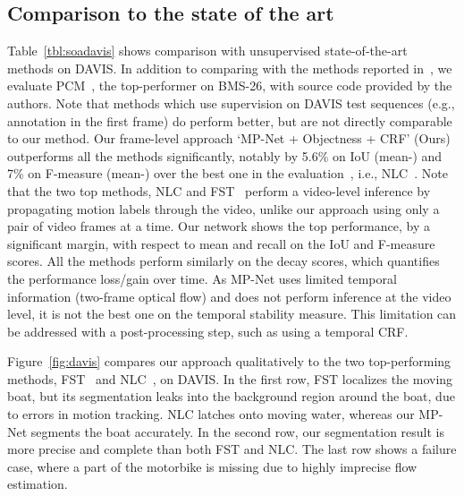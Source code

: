 \documentclass[10pt,twocolumn,letterpaper]{article}
\begin{document}
\subsection{Comparison to the state of the art}
\label{sec:soa}
\vspace{-0.2cm}
Table~\ref{tbl:soadavis} shows comparison with unsupervised state-of-the-art
methods on DAVIS. In addition to comparing with the methods reported
in~\cite{Perazzi16}, we evaluate PCM~\cite{Bideau16}, the top-performer on
BMS-26, with source code provided by the authors. Note that methods which use
supervision on DAVIS test sequences (e.g., annotation in the first frame) do
perform better, but are not directly comparable to our method. Our frame-level
approach `MP-Net + Objectness + CRF' (Ours) outperforms all the methods
significantly, notably by 5.6\% on IoU (mean-) and 7\% on
F-measure (mean-) over the best one in the
evaluation~\cite{Perazzi16}, i.e., NLC~\cite{Faktor14}. Note that the two top
methods, NLC and FST~\cite{papazoglou2013fast} perform a video-level inference
by propagating motion labels through the video, unlike our approach using only
a pair of video frames at a time. Our network shows the top performance, by a
significant margin, with respect to mean and recall on the IoU and F-measure
scores. All the methods perform similarly on the decay scores, which quantifies
the performance loss/gain over time. As MP-Net uses limited temporal
information (two-frame optical flow) and does not perform inference at the
video level, it is not the best one on the temporal stability measure. This
limitation can be addressed with a post-processing step, such as using a
temporal CRF.

Figure~\ref{fig:davis} compares our approach qualitatively to the two
top-performing methods, FST~\cite{papazoglou2013fast} and NLC~\cite{Faktor14},
on DAVIS. In the first row, FST localizes the moving boat, but its segmentation
leaks into the background region around the boat, due to errors in motion
tracking. NLC latches onto moving water, whereas our MP-Net segments the boat
accurately.
In the second row, our segmentation result is more precise and complete than
both FST and NLC. The last row shows a failure case, where a part of the
motorbike is missing due to highly imprecise flow estimation.
\end{document}
